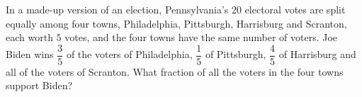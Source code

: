 In a made-up version of an election, Pennsylvania's $20$ electoral votes are split equally among four towns, Philadelphia, Pittsburgh, Harrisburg and Scranton, each worth $5$ votes, and the four towns have the same number of voters. Joe Biden wins $\dfrac35$ of the voters of Philadelphia, $\dfrac15$ of Pittsburgh, $\dfrac45$ of Harrisburg and all of the voters of Scranton. What fraction of all the voters in the four towns support Biden?
